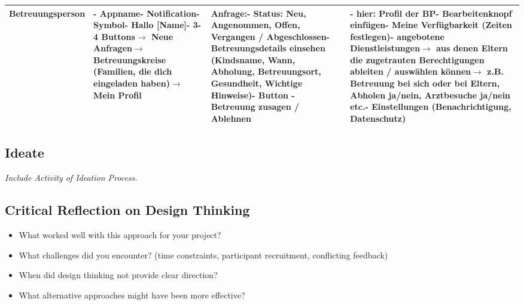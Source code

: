 \begin{table}[h]
\begin{tabularx}{\linewidth}{|l|X|X|X|}
Betreuungsperson
& - Appname\newline - Notification-Symbol\newline - Hallo {[}Name{]}\newline - 3-4 Buttons\newline $\rightarrow$ Neue Anfragen\newline $\rightarrow$ Betreuungskreise (Familien, die dich eingeladen haben)\newline $\rightarrow$ Mein Profil
& Anfrage:\newline - Status: Neu, Angenommen, Offen, Vergangen / Abgeschlossen\newline - Betreuungsdetails einsehen (Kindsname, Wann, Abholung, Betreuungsort, Gesundheit, Wichtige Hinweise)\newline - Button - Betreuung zusagen / Ablehnen
& - hier: Profil der BP\newline - Bearbeitenknopf einfügen\newline - Meine Verfügbarkeit (Zeiten festlegen)\newline - angebotene Dienstleistungen\newline $\rightarrow$ aus denen Eltern die zugetrauten Berechtigungen ableiten / auswählen können\newline $\rightarrow$  z.B. Betreuung bei sich oder bei Eltern, Abholen ja/nein, Arztbesuche ja/nein etc.\newline - Einstellungen (Benachrichtigung, Datenschutz)\\ \hline
\end{tabularx}
\end{table}


\subsection{Ideate}
\emph{Include Activity of Ideation Process.}

\subsection{Critical Reflection on Design Thinking}

\begin{itemize}
    \item What worked well with this approach for your project?
    \item What challenges did you encounter? (time constraints, participant recruitment, conflicting feedback)
    \item When did design thinking not provide clear direction?
    \item What alternative approaches might have been more effective?
\end{itemize}